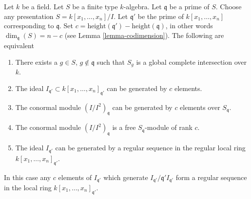 \begin{lemma}
\label{lemma-lci}
Let $k$ be a field.
Let $S$ be a finite type $k$-algebra.
Let $\mathfrak q$ be a prime of $S$.
Choose any presentation $S = k[x_1, \ldots, x_n]/I$.
Let $\mathfrak q'$ be the prime of $k[x_1, \ldots, x_n]$ corresponding
to $\mathfrak q$. Set
$c = \text{height}(\mathfrak q') - \text{height}(\mathfrak q)$,
in other words $\dim_{\mathfrak q}(S) = n - c$
(see Lemma \ref{lemma-codimension}). The following are equivalent
\begin{enumerate}
\item There exists a $g \in S$, $g \not \in \mathfrak q$
such that $S_g$ is a global complete intersection over $k$.
\item The ideal $I_{\mathfrak q'} \subset k[x_1, \ldots, x_n]_{\mathfrak q'}$
can be generated by $c$ elements.
\item The conormal module $(I/I^2)_{\mathfrak q}$ can be generated by
$c$ elements over $S_{\mathfrak q}$.
\item The conormal module $(I/I^2)_{\mathfrak q}$ is a free
$S_{\mathfrak q}$-module of rank $c$.
\item The ideal $I_{\mathfrak q'}$ can be generated by a regular sequence
in the regular local ring $k[x_1, \ldots, x_n]_{\mathfrak q'}$.
\end{enumerate}
In this case any $c$ elements of $I_{\mathfrak q'}$
which generate $I_{\mathfrak q'}/\mathfrak q'I_{\mathfrak q'}$
form a regular sequence in the local
ring $k[x_1, \ldots, x_n]_{\mathfrak q'}$.
\end{lemma}


